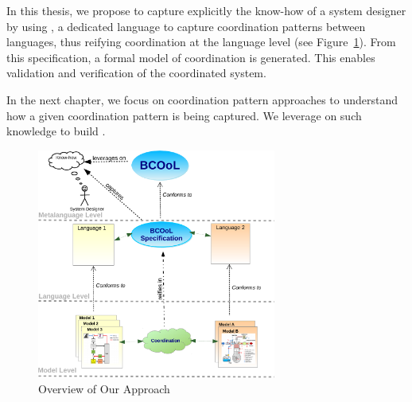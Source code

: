 In this thesis, we propose to capture explicitly the know-how of a system designer by using \bcool, a dedicated language to capture coordination patterns between languages, thus reifying coordination at the language level (see Figure~\ref{fig:bcoolapp}). From this specification, a formal model of coordination is generated. This enables validation and verification of the coordinated system. 

In the next chapter, we focus on coordination pattern approaches to understand how a given coordination pattern is being captured. We leverage on such knowledge to build \bcool. 

\begin{figure}
\begin{center}
\includegraphics[width=0.7\textwidth]{background/figs/bcoolapp}
\caption{Overview of Our Approach}
\label{fig:bcoolapp}
\end{center}
\end{figure}	


